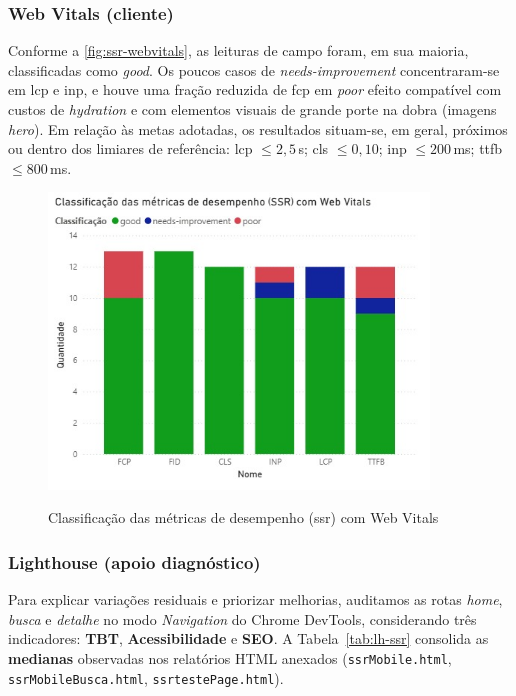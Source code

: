 \subsubsection{Web Vitals (cliente)}
Conforme a \autoref{fig:ssr-webvitals}, as leituras de campo foram, em sua maioria, classificadas como \textit{good}. Os poucos casos de \textit{needs-improvement} concentraram-se em \acrshort{lcp} e \acrshort{inp}, e houve uma fração reduzida de \acrshort{fcp} em \textit{poor} efeito compatível com custos de \textit{hydration} e com elementos visuais de grande porte na dobra (imagens \emph{hero}). Em relação às metas adotadas, os resultados situam-se, em geral, próximos ou dentro dos limiares de referência: \acrshort{lcp} $\leq 2{,}5$\,s; \acrshort{cls} $\leq 0{,}10$; \acrshort{inp} $\leq 200$\,ms; \acrshort{ttfb} $\leq 800$\,ms.

\begin{figure}[H]
    \centering
    \caption{Classificação das métricas de desempenho (\acrshort{ssr}) com Web Vitals}
    \includegraphics[width=0.9\textwidth]{media/metricas_ssr_web_vitals.jpeg}
    \label{fig:ssr-webvitals}
\end{figure}

\subsubsection{Lighthouse (apoio diagnóstico)}
Para explicar variações residuais e priorizar melhorias, auditamos as rotas \emph{home}, \emph{busca} e \emph{detalhe} no modo \emph{Navigation} do Chrome DevTools, considerando três indicadores: \textbf{TBT}, \textbf{Acessibilidade} e \textbf{SEO}.
A Tabela~\ref{tab:lh-ssr} consolida as \textbf{medianas} observadas nos relatórios HTML anexados (\texttt{ssrMobile.html}, \texttt{ssrMobileBusca.html}, \texttt{ssrtestePage.html}).

